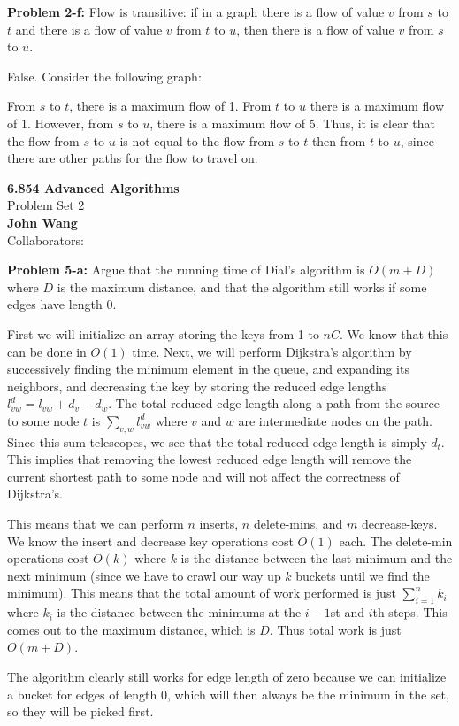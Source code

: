 \documentclass[psamsfonts]{amsart}
\newenvironment{sol}{\vspace{0.25cm}{\large \bfseries Solution:}}{\qedsymbol}
\newenvironment{prob}[1]{\begin{framed}{\large \bfseries Problem #1:}}{\end{framed}}
\newcommand{\makenewtitle}{
    \begin{center}
    {\huge \bfseries 6.854 Advanced Algorithms} \\
    Problem Set 2\\
    \vspace{0.25cm}
    {\bfseries John Wang} \\
    Collaborators:
    \end{center}
    \vspace{0.5cm}
}
\begin{document}
\begin{prob}{2-f}
Flow is transitive: if in a graph there is a flow of value $v$ from $s$ to $t$ and there is a flow of value $v$ from $t$ to $u$, then there is a flow of value $v$ from $s$ to $u$.
\end{prob}
\begin{sol}
False. Consider the following graph:
\begin{figure}[h!]
\centering
{}
\end{figure}

From $s$ to $t$, there is a maximum flow of 1. From $t$ to $u$ there is a maximum flow of $1$. However, from $s$ to $u$, there is a maximum flow of 5. Thus, it is clear that the flow from $s$ to $u$ is not equal to the flow from $s$ to $t$ then from $t$ to $u$, since there are other paths for the flow to travel on. 
\end{sol}

\newpage
\makenewtitle

\begin{prob}{5-a}
Argue that the running time of Dial's algorithm is $O(m+D)$ where $D$ is the maximum distance, and that the algorithm still works if some edges have length 0.
\end{prob}
\begin{sol}
First we will initialize an array storing the keys from 1 to $nC$. We know that this can be done in $O(1)$ time. Next, we will perform Dijkstra's algorithm by successively finding the minimum element in the queue, and expanding its neighbors, and decreasing the key by storing the reduced edge lengths $l_{vw}^d = l_{vw} + d_v - d_w$. The total reduced edge length along a path from the source to some node $t$ is $\sum_{v,w} l_{vw}^d$ where $v$ and $w$ are intermediate nodes on the path. Since this sum telescopes, we see that the total reduced edge length is simply $d_t$. This implies that removing the lowest reduced edge length will remove the current shortest path to some node and will not affect the correctness of Dijkstra's.

This means that we can perform $n$ inserts, $n$ delete-mins, and $m$ decrease-keys. We know the insert and decrease key operations cost $O(1)$ each. The delete-min operations cost $O(k)$ where $k$ is the distance between the last minimum and the next minimum (since we have to crawl our way up $k$ buckets until we find the minimum). This means that the total amount of work performed is just $\sum_{i=1}^n k_i$ where $k_i$ is the distance between the minimums at the $i-1$st and $i$th steps. This comes out to the maximum distance, which is $D$. Thus total work is just $O(m + D)$. 

The algorithm clearly still works for edge length of zero because we can initialize a bucket for edges of length 0, which will then always be the minimum in the set, so they will be picked first.
\end{sol}
\end{document}
